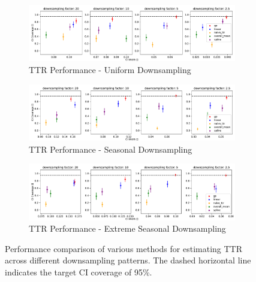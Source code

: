 \begin{figure}[!htb]
\centering
\begin{subfigure}{\textwidth}
    \centering
    \includegraphics[width=\linewidth]{Pictures/final_experiments_spline_ridge_quantile_max100/ttr_eval_sin_rbf_default}
    \caption{TTR Performance - Uniform Downsampling}
    \label{fig:ttr-uniform-sampling-performance}
\end{subfigure}

\bigskip

\begin{subfigure}{\textwidth}
    \centering
    \includegraphics[width=\linewidth]{Pictures/final_experiments_spline_ridge_quantile_max100/ttr_eval_sin_rbf_seasonal_default}
    \caption{TTR Performance - Seasonal Downsampling}
    \label{fig:ttr-seasonal-sampling-performance}
\end{subfigure}

\bigskip

\begin{subfigure}{\textwidth}
    \centering
    \includegraphics[width=\linewidth]{Pictures/final_experiments_spline_ridge_quantile_max100/ttr_eval_sin_rbf_seasonal_extreme}
    \caption{TTR Performance - Extreme Seasonal Downsampling}
    \label{fig:ttr-extreme-seasonal-sampling-performance}
\end{subfigure}

\caption[TTR Performance]{Performance comparison of various methods for
estimating TTR across different downsampling patterns.
The dashed horizontal line indicates the target CI coverage of 95\%.
}
\label{fig:ttr-performance}
\end{figure}

